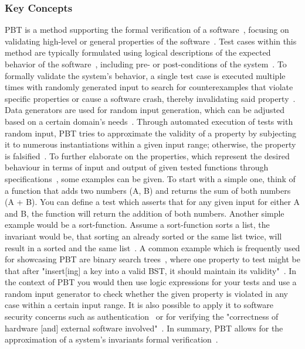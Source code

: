 \documentclass[runningheads]{llncs}
\begin{document}
\subsubsection{Key Concepts}
PBT is a method supporting the formal verification of a software~\cite{Chen2022,Fink1997,Honarvar2020,Paraskevopoulou2015}, focusing on validating high-level or general properties of the software~\cite{Fink1997,Honarvar2020,Corgozinho2023}. Test cases within this method are typically formulated using logical descriptions of the expected behavior of the software~\cite{Chen2022,Fink1997,Honarvar2020,Loescher2017,Corgozinho2023}, including pre- or post-conditions of the system~\cite{Honarvar2020}. To formally validate the system's behavior, a single test case is executed multiple times with randomly generated input to search for counterexamples that violate specific properties or cause a software crash, thereby invalidating said property~\cite{Chen2022,Loescher2017,Padhye2019,ElazarMittelman2023,Paraskevopoulou2015,Corgozinho2023}. Data generators are used for random input generation, which can be adjusted based on a certain domain's needs~\cite{Chen2022,Loescher2017,Padhye2019,ElazarMittelman2023}. Through automated execution of tests with random input, PBT tries to approximate the validity of a property by subjecting it to numerous instantiations within a given input range; otherwise, the property is falsified~\cite{Fink1997,ElazarMittelman2023,Corgozinho2023,Paraskevopoulou2015}. To further elaborate on the properties, which represent the desired behaviour in terms of input and output of given tested functions through specifications~\cite{Chen2022,Fink1997,Loescher2017}, some examples can be given. To start with a simple one, think of a function that adds two numbers (A, B) and returns the sum of both numbers (A + B). You can define a test which asserts that for any given input for either A and B, the function will return the addition of both numbers. Another simple example would be a sort-function. Assume a sort-function sorts a list, the invariant would be, that sorting an already sorted or the same list twice, will result in a sorted and the same list~\cite{Corgozinho2023}. A common example which is frequently used for showcasing PBT are binary search trees~\cite{Corgozinho2023,Shi2023}, where one property to test might be that after "insert[ing] a key into a valid BST, it should maintain its validity"~\cite{Shi2023}. In the context of PBT you would then use logic expressions for your tests and use a random input generator to check whether the given property is violated in any case within a certain input range. It is also possible to apply it to software security concerns such as authentication~\cite{Fink1997} or for verifying the "correctness of hardware [and] external software involved"~\cite{Chen2022}. In summary, PBT allows for the approximation of a system's invariants formal verification~\cite{Fink1997,ElazarMittelman2023,Corgozinho2023}.
\end{document}
